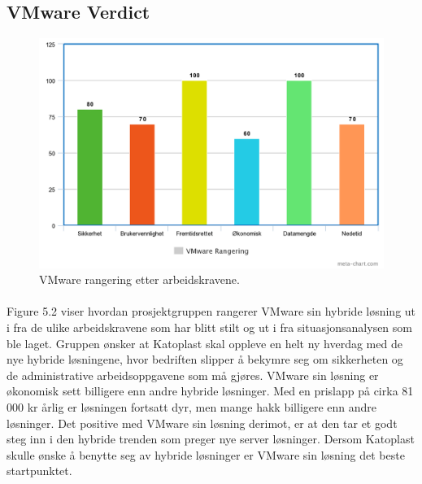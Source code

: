 \subsection{VMware Verdict}
\begin{figure}[H]
\centering
\includegraphics[width=6.5in]{Bilder/chart2.png}
\caption{VMware rangering etter arbeidskravene.}
\end{figure}

\paragraph{} Figure 5.2 viser hvordan prosjektgruppen rangerer VMware sin hybride løsning ut i fra de ulike arbeidskravene som har blitt stilt og ut i fra situasjonsanalysen som ble laget. Gruppen ønsker at Katoplast skal oppleve en helt ny hverdag med de nye hybride løsningene, hvor bedriften slipper å bekymre seg om sikkerheten og de administrative arbeidsoppgavene som må gjøres. VMware sin løsning er økonomisk sett billigere enn andre hybride løsninger.  Med en prislapp på cirka 81 000 kr årlig er løsningen fortsatt dyr, men mange hakk billigere enn andre løsninger. Det positive med VMware sin løsning derimot, er at den tar et godt steg inn i den hybride trenden som preger nye server løsninger. Dersom Katoplast skulle ønske å benytte seg av hybride løsninger er VMware sin løsning det beste startpunktet. 
